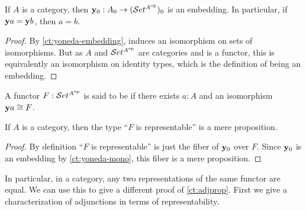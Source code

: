 \begin{cor}\label{ct:yoneda-mono}
  If $A$ is a category, then $\mathbf{y}_0 : A_0 \to (\mathcal{S}et^{A^{\mathrm{op}}})_0$ is an embedding.
  In particular, if $\mathbf{y} a = \mathbf{y} b$, then $a=b$.
\end{cor}
\begin{proof}
  By \cref{ct:yoneda-embedding}, \y induces an isomorphism on sets of isomorphisms.
  But as $A$ and $\mathcal{S}et^{A^{\mathrm{op}}}$ are categories and \y is a functor, this is equivalently an isomorphism on identity types, which is the definition of being an embedding.
\end{proof}

\begin{defn}\label{ct:representable}
  A functor $F:\mathcal{S}et^{A^{\mathrm{op}}}$ is said to be 
  if there exists $a:A$ and an isomorphism $\mathbf{y} a \cong F$.
\end{defn}

\begin{thm}\label{ct:representable-prop}
  If $A$ is a category, then the type ``$F$ is representable'' is a mere proposition.
\end{thm}
\begin{proof}
  By definition ``$F$ is representable'' is just the fiber of $\mathbf{y}_0$ over $F$.
  Since $\mathbf{y}_0$ is an embedding by \cref{ct:yoneda-mono}, this fiber is a mere proposition.
\end{proof}

In particular, in a category, any two representations of the same functor are equal.
We can use this to give a different proof of \cref{ct:adjprop}.
First we give a characterization of adjunctions in terms of representability.

